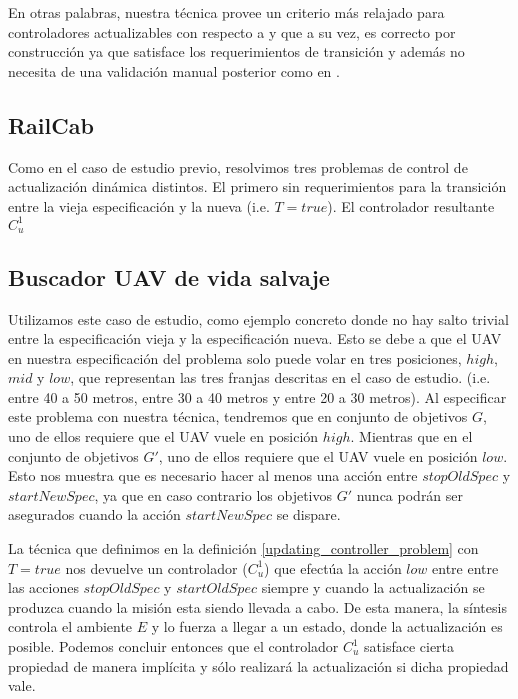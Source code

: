 En otras palabras, nuestra técnica provee un criterio más relajado para controladores actualizables con respecto a
\cite{6224401} y que a su vez, es correcto por construcción ya que satisface los requerimientos de transición y además
no necesita de una validación manual posterior como en \cite{PanzicaLaManna:2013:FCC:2487336.2487349}.

\subsection{RailCab}

Como en el caso de estudio previo, resolvimos tres problemas de control de actualización dinámica distintos. El primero
sin requerimientos para la transición entre la vieja especificación y la nueva (i.e. $T = true$). El controlador
resultante $C^1_u$

\subsection{Buscador UAV de vida salvaje}

Utilizamos este caso de estudio, como ejemplo concreto donde no hay salto trivial entre la especificación vieja y la
especificación nueva. Esto se debe a que el UAV en nuestra especificación del problema solo puede volar en tres
posiciones, $high$, $mid$ y $low$, que representan las tres franjas descritas en el caso de estudio. (i.e. entre 40 a 50
metros, entre 30 a 40 metros y entre 20 a 30 metros). Al especificar este problema con nuestra técnica, tendremos que en
conjunto de objetivos $G$, uno de ellos requiere que el UAV vuele en posición $high$. Mientras que en el conjunto de
objetivos $G'$, uno de ellos requiere que el UAV vuele en posición $low$. Esto nos muestra que es necesario hacer
al menos una acción entre $stopOldSpec$ y $startNewSpec$, ya que en caso contrario los objetivos $G'$ nunca podrán ser
asegurados cuando la acción $startNewSpec$ se dispare.

La técnica que definimos en la definición \ref{updating_controller_problem} con $T = true$ nos devuelve un controlador
($C_u^{1}$) que efectúa la acción $low$ entre entre las acciones $stopOldSpec$ y $startOldSpec$ siempre y cuando la
actualización se produzca cuando la misión esta siendo llevada a cabo. De esta manera, la síntesis controla el ambiente
$E$ y lo fuerza a llegar a un estado, donde la actualización es posible. Podemos concluir entonces que el controlador
$C_u^1$ satisface cierta propiedad de manera implícita y sólo realizará la actualización si dicha propiedad vale.

